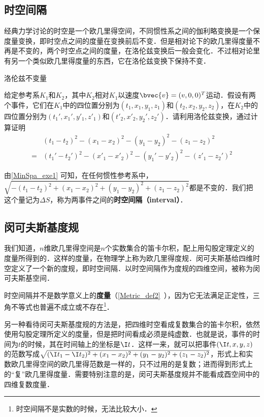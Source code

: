 

\subsection{时空间隔}
经典力学讨论的时空是一个欧几里得空间，不同惯性系之间的伽利略变换是一个保度量变换，即时空点之间的度量在变换前后不变．但是相对论下的欧几里得度量不再是不变的，两个时空点之间的度量，在洛伦兹变换后一般会变化．不过相对论里有另一个类似欧几里得度量的东西，它在洛伦兹变换下保持不变．

\begin{exercise}{洛伦兹不变量}\label{MinSpa_exe1}

给定参考系$K_1$和$K_2$，其中$K_2$相对$K_1$以速度$\bvec{v}=(v,0,0)^T$运动．假设有两个事件，它们在$K_1$中的四位置分别为$(t_1, x_1, y_1, z_1)$和$(t_2, x_2, y_2, z_2)$，在$K_2$中的四位置分别为$(t_1', x_1', y'_1, z'_1)$和$(t'_2, x'_2, y_2', z_2')$．请利用洛伦兹变换，通过计算证明
\begin{equation}
\begin{aligned}
&(t_1-t_2)^2-(x_1-x_2)^2-(y_1-y_2)^2-(z_1-z_2)^2\\=&(t_1'-t_2')^2-(x'_1-x'_2)^2-(y_1'-y'_2)^2-(z'_1-z_2')^2
\end{aligned}
\end{equation}
\end{exercise}

由\autoref{MinSpa_exe1} 可知，在任何惯性参考系中，$\sqrt{-(t_1-t_2)^2+(x_1-x_2)^2+(y_1-y_2)^2+(z_1-z_2)^2}$都是不变的．我们把这个量记为$\Delta S$，称为两事件之间的\textbf{时空间隔（interval）}．

\subsection{闵可夫斯基度规}

我们知道，$n$维欧几里得空间是$n$个实数集合的笛卡尔积，配上用勾股定理定义的度量所得到的．这样的度量，在物理学上称为欧几里得度规．闵可夫斯基给四维时空定义了一个新的度规，即时空间隔．以时空间隔作为度规的四维空间，被称为闵可夫斯基空间．

时空间隔并不是数学意义上的\textbf{度量}（\autoref{Metric_def2}~），因为它无法满足正定性，三角不等式也普遍不成立或不存在\footnote{时空间隔不是实数的时候，无法比较大小．}．

另一种看待闵可夫斯基度规的方法是，把四维时空看成复数集合的笛卡尔积，依然使用勾股定理所定义的度量，但是把时间看成必须是纯虚数．也就是说，事件的时间为$t$的时候，其在时间轴上的坐标是$\I t$．这样一来，就可以把事件$(\I t, x, y, z)$的范数写成$\sqrt{(\I t_1-\I t_2)^2+(x_1-x_2)^2+(y_1-y_2)^2+(z_1-z_2)^2}$，形式上和实数欧几里得空间的欧几里得范数是一样的，只不过用的是复数；进而得到形式上的“复”欧几里得度量．需要特别注意的是，闵可夫斯基度规并不能看成酉空间中的四维复数度量．

